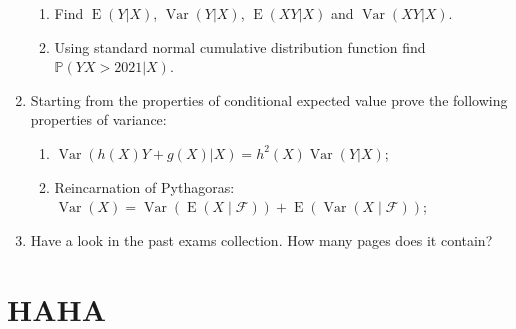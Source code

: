 \documentclass[12pt]{article}
\DeclareMathOperator{\Var}{Var}
\DeclareMathOperator{\E}{E}
\def \cF{\mathcal{F}}
\def \P{\mathbb{P}}
\begin{document}
\begin{enumerate}
\begin{enumerate}
  \item Find $\E(Y|X)$, $\Var(Y|X)$, $\E(XY|X)$ and $\Var(XY|X)$.
  \item Using standard normal cumulative distribution function find $\P(YX > 2021 | X)$.
\end{enumerate}

\item Starting from the properties of conditional expected value prove the following properties
of variance:

\begin{enumerate}
  \item $\Var(h(X)Y + g(X)|X) = h^2(X)\Var(Y|X)$;
  \item Reincarnation of Pythagoras: $\Var(X) = \Var(\E(X \mid \cF)) + \E(\Var(X \mid \cF))$;
\end{enumerate}



\item Have a look in the past exams collection. How many pages does it contain?


\end{enumerate}



\newpage
\section{HAHA}
\end{document}
